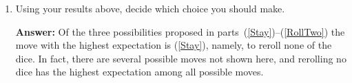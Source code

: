 \documentclass[12pt]{article}
\begin{document}
\begin{enumerate}
\begin{enumerate}
{\bf Solution:} The following table shows
all the possible outcomes, where
the wildcards $x$ and $y$ denote one of the numbers
$2,3,4,6$.
\[\begin{array}{ccc}
\text{Roll}&\text{Probability}&\text{Net outcome}\\\hline
\left(1,1\right)&1/36&500\\
\left(5,5\right)&1/36&400\\
\left(1,5\right),\left(5,1\right)&2/36&450\\
\left(1,x\right),\left(x,1\right)&8/36&400\\
\left(5,x\right),\left(x,5\right)&8/36&350\\
\left(x,y\right)&16/36&0\\
\end{array}\]
Thus the expected winnings are
\[\frac{1}{36}\left(\rule{0pt}{12pt}
1\left(500\right)+1\left(400\right)
+8\left(400\right)+2\left(450\right)
+8\left(350\right)\right)\approx 217\]

\item Using your results above, decide which
choice you should make.

{\bf Answer:} Of the three possibilities proposed in
parts~(\ref{Stay})--(\ref{RollTwo}) the move
with the highest expectation is (\ref{Stay}), namely,
to reroll none of the dice. In fact,
there are several possible moves not shown here, and 
rerolling no dice has the highest expectation among
all possible moves.
\end{enumerate}
\end{enumerate}
\end{document}
